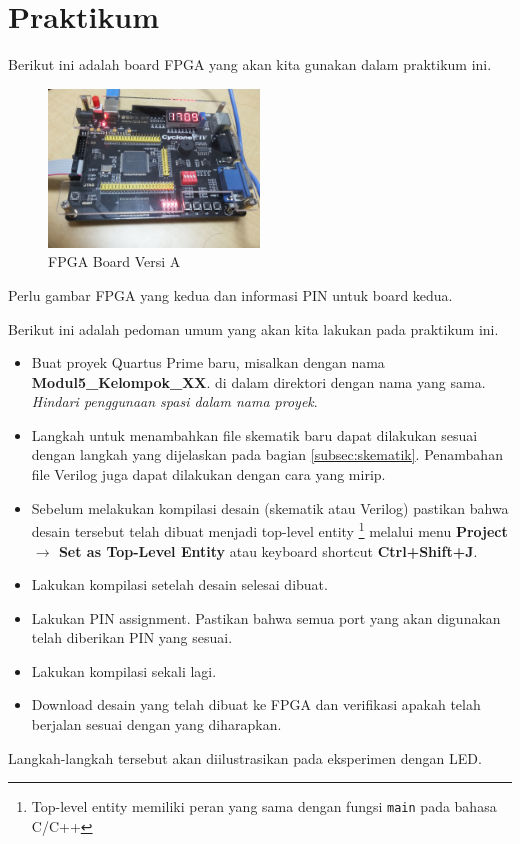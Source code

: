 \section{Praktikum}

Berikut ini adalah board FPGA yang akan kita gunakan dalam praktikum ini.

\begin{figure}[H]
{\centering
\includegraphics[width=0.5\textwidth]{images/foto_FPGA_v1.jpg}
\par}
\caption{FPGA Board Versi A}
\end{figure}

{\color{red}Perlu gambar FPGA yang kedua dan informasi PIN untuk board kedua.}

Berikut ini adalah pedoman umum yang akan kita lakukan pada praktikum ini.

\begin{itemize}

\item Buat proyek Quartus Prime baru, misalkan dengan nama \textbf{Modul5\_Kelompok\_XX}.
di dalam direktori dengan nama yang sama. \textit{Hindari penggunaan
spasi dalam nama proyek}.

\item Langkah untuk menambahkan file skematik baru dapat dilakukan sesuai dengan langkah yang
dijelaskan pada bagian \ref{subsec:skematik}. Penambahan file Verilog
juga dapat dilakukan dengan cara yang mirip.

\item Sebelum melakukan kompilasi desain (skematik atau Verilog)
pastikan bahwa desain tersebut telah dibuat menjadi top-level entity
\footnote{Top-level entity memiliki peran yang sama
dengan fungsi \texttt{main} pada bahasa C/C++}
melalui menu \textbf{Project $\rightarrow$ Set as Top-Level Entity} atau
keyboard shortcut \textbf{Ctrl+Shift+J}.

\item Lakukan kompilasi setelah desain selesai dibuat.

\item Lakukan PIN assignment. Pastikan bahwa semua port yang akan digunakan
telah diberikan PIN yang sesuai.

\item Lakukan kompilasi sekali lagi.

\item Download desain yang telah dibuat ke FPGA dan verifikasi apakah telah berjalan
sesuai dengan yang diharapkan.
\end{itemize}

Langkah-langkah tersebut akan diilustrasikan pada eksperimen dengan LED.
